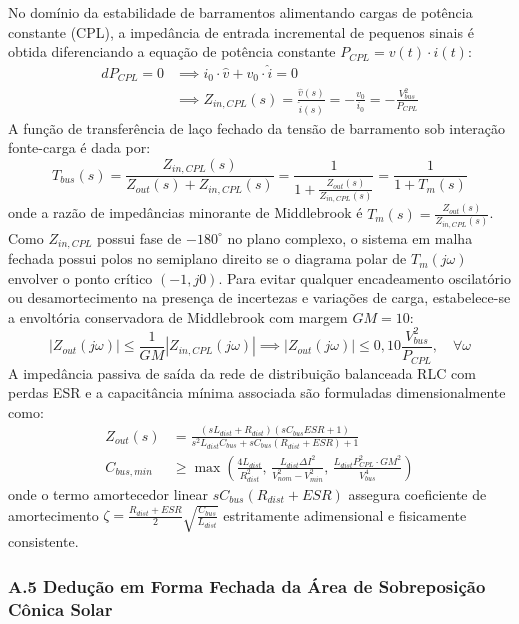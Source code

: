No domínio da estabilidade de barramentos alimentando cargas de potência constante (CPL), a impedância de entrada incremental de pequenos sinais é obtida diferenciando a equação de potência constante $P_{CPL} = v(t) \cdot i(t)$:
\begin{align}
    d P_{CPL} = 0 &\implies i_0 \cdot \hat{v} + v_0 \cdot \hat{i} = 0 \nonumber \\
    &\implies Z_{in,CPL}(s) = \frac{\hat{v}(s)}{\hat{i}(s)} = - \frac{v_0}{i_0} = - \frac{V_{bus}^2}{P_{CPL}}
\end{align}
A função de transferência de laço fechado da tensão de barramento sob interação fonte-carga é dada por:
\begin{equation}
    T_{bus}(s) = \frac{Z_{in,CPL}(s)}{Z_{out}(s) + Z_{in,CPL}(s)} = \frac{1}{1 + \frac{Z_{out}(s)}{Z_{in,CPL}(s)}} = \frac{1}{1 + T_m(s)}
\end{equation}
onde a razão de impedâncias minorante de Middlebrook é $T_m(s) = \frac{Z_{out}(s)}{Z_{in,CPL}(s)}$. Como $Z_{in,CPL}$ possui fase de $-180^\circ$ no plano complexo, o sistema em malha fechada possui polos no semiplano direito se o diagrama polar de $T_m(j\omega)$ envolver o ponto crítico $(-1, j0)$. Para evitar qualquer encadeamento oscilatório ou desamortecimento na presença de incertezas e variações de carga, estabelece-se a envoltória conservadora de Middlebrook com margem $GM = 10$:
\begin{equation}
    |Z_{out}(j\omega)| \le \frac{1}{GM} |Z_{in,CPL}(j\omega)| \implies |Z_{out}(j\omega)| \le 0{,}10 \frac{V_{bus}^2}{P_{CPL}}, \quad \forall \omega
\end{equation}
A impedância passiva de saída da rede de distribuição balanceada RLC com perdas ESR e a capacitância mínima associada são formuladas dimensionalmente como:
\begin{align}
    Z_{out}(s) &= \frac{(s L_{dist} + R_{dist})(s C_{bus} ESR + 1)}{s^2 L_{dist} C_{bus} + s C_{bus} (R_{dist} + ESR) + 1} \\
    C_{bus,min} &\ge \max\left( \frac{4 L_{dist}}{R_{dist}^2}, \, \frac{L_{dist} \Delta I^2}{V_{nom}^2 - V_{min}^2}, \, \frac{L_{dist} P_{CPL}^2 \cdot GM^2}{V_{bus}^4} \right)
\end{align}
onde o termo amortecedor linear $s C_{bus} (R_{dist} + ESR)$ assegura coeficiente de amortecimento $\zeta = \frac{R_{dist} + ESR}{2}\sqrt{\frac{C_{bus}}{L_{dist}}}$ estritamente adimensional e fisicamente consistente.

\subsubsection*{A.5 Dedução em Forma Fechada da Área de Sobreposição Cônica Solar}

